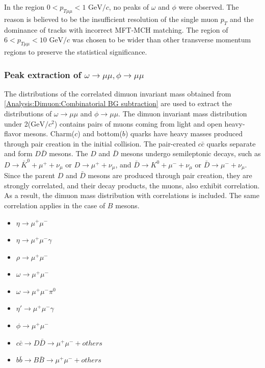                 In the region \(0 < p_{T\mu\mu} < 1\) $\mathrm{GeV}/c$, no peaks of \(\omega\) and \(\phi\) were observed. The reason is believed to be the insufficient resolution of the single muon \(p_T\) and the dominance of tracks with incorrect MFT-MCH matching.
                The region of \(6 < p_{T\mu\mu} < 10\) $\mathrm{GeV}/c$ was chosen to be wider than other transverse momentum regions to preserve the statistical significance.
        
            \subsubsection{Peak extraction of $\omega \rightarrow \mu\mu ,\phi \rightarrow \mu\mu$}
            \label{Peak_extraction}
                The distributions of the correlated dimuon invariant mass obtained from \ref{Analysis:Dimuon:Combinatorial BG subtraction} are used to extract the distributions of $\omega \rightarrow \mu\mu$ and $\phi \rightarrow \mu\mu$. The dimuon invariant mass distribution under 2($\mathrm{GeV/}c^2$) contains pairs of muons coming from light and open heavy-flavor mesons. Charm($c$) and bottom($b$) quarks have heavy masses produced through pair creation in the initial collision. The pair-created \(c\bar{c}\) quarks separate and form \(D\bar{D}\) mesons. The \(D\) and \(\bar{D}\) mesons undergo semileptonic decays, such as \(D \rightarrow \bar{K}^0 + \mu^+ + \nu_\mu\) or \(D \rightarrow \mu^+ + \nu_\mu\), and \(\bar{D} \rightarrow K^0 + \mu^- + \nu_\mu\) or \(\bar{D} \rightarrow \mu^- + \nu_\mu\). Since the parent \(D\) and \(\bar{D}\) mesons are produced through pair creation, they are strongly correlated, and their decay products, the muons, also exhibit correlation. As a result, the dimuon mass distribution with correlations is included. The same correlation applies in the case of \(B\) mesons.
                \begin{itemize}
                    \item $\eta \rightarrow \mu^+ \mu^-$
                    \item $\eta \rightarrow \mu^+ \mu^- \gamma$
                    \item $\rho \rightarrow \mu^+ \mu^-$
                    \item $\omega \rightarrow \mu^+ \mu^-$
                    \item $\omega \rightarrow \mu^+ \mu^- \pi^0$
                    \item $\eta' \rightarrow \mu^+ \mu^- \gamma$
                    \item $\phi \rightarrow \mu^+ \mu^-$
                    \item $c\bar{c} \rightarrow D\bar{D} \rightarrow \mu^+ \mu^- + others$
                    \item $b\bar{b} \rightarrow B\bar{B} \rightarrow \mu^+ \mu^- + others$
                \end{itemize}
